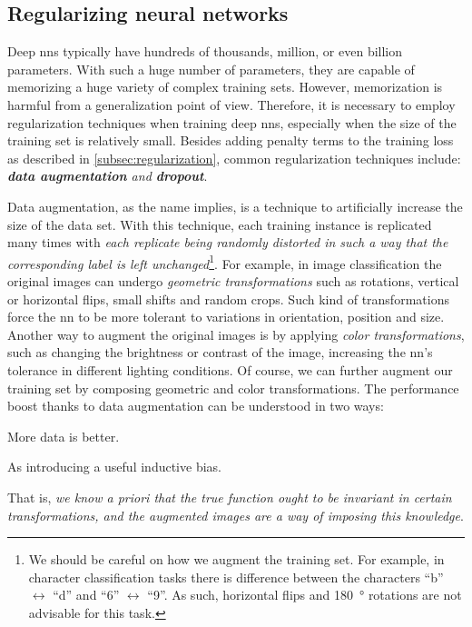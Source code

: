 \subsection{Regularizing neural networks}
\label{subsec:regularization_nn}

Deep \glspl{nn} typically have hundreds of thousands, million, or even billion
parameters. With such a huge number of parameters, they are capable of
memorizing a huge variety of complex training sets. However,
memorization is harmful from a generalization point of view. Therefore, it
is necessary to employ regularization techniques when training deep \glspl{nn}, especially when the size of the
training set is relatively small. Besides adding penalty terms to the training
loss as described in \Section{}
\ref{subsec:regularization}, common regularization techniques include:
\emph{\textbf{data augmentation} and
\textbf{dropout}}.

Data augmentation, as the name implies, is a technique to artificially increase
the size of the data set. With this technique, each training instance is
replicated many times with \emph{each replicate being randomly distorted in such
a way that the corresponding label is left unchanged}\footnote{We
should be careful on how we augment the training set. For example, in character
classification tasks there is difference between the characters ``b''
$\leftrightarrow$ ``d'' and ``6'' $\leftrightarrow$ ``9''. As such, horizontal
flips and \SI{180}{\degree} rotations are not advisable for this task.}. For
example, in image classification the original images can undergo \emph{geometric
transformations} such as rotations, vertical or
horizontal flips, small shifts and random crops. Such kind of transformations
force the \gls{nn} to be more tolerant to variations in orientation, position
and size. Another way to augment the original images is by applying \emph{color
transformations}, such as changing the brightness or contrast of the image,
increasing the \gls{nn}'s tolerance in different lighting conditions. Of course,
we can further augment our training set by composing geometric and color
transformations. The performance boost thanks to data augmentation can be
understood in two ways:
\begin{enumerate*}
	\item More data is better.
	\item As introducing a useful inductive bias.
\end{enumerate*}
That is, \emph{we know a priori that the true function ought to be invariant in
certain transformations, and the augmented images are a way of imposing
this knowledge}.

